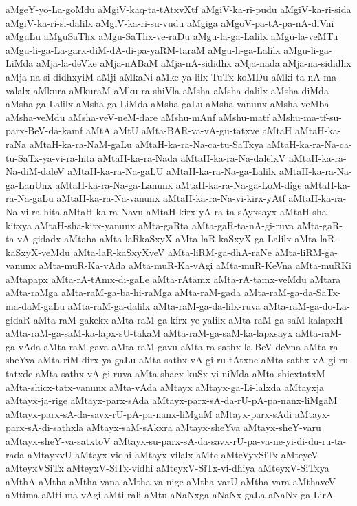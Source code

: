 {aMgeY-yo-La-goMdu
aMgiV-kaq-ta-tAtxvXtf
aMgiV-ka-ri-pudu
aMgiV-ka-ri-sida
aMgiV-ka-ri-si-dalilx
aMgiV-ka-ri-su-vudu
aMgiga
aMgoV-pa-tA-pa-nA-diVni
aMguLu
aMguSaThx
aMgu-SaThx-ve-raDu
aMgu-la-ga-Lalilx
aMgu-la-veMTu
aMgu-li-ga-La-garx-diM-dA-di-pa-yaRM-taraM
aMgu-li-ga-Lalilx
aMgu-li-ga-LiMda
aMja-la-deVke
aMja-nABaM
aMja-nA-sididhx
aMja-nada
aMja-na-sididhx
aMja-na-si-didhxyiM
aMji
aMkaNi
aMke-ya-lilx-TuTx-koMDu
aMki-ta-nA-ma-valalx
aMkura
aMkuraM
aMku-ra-shiVla
aMsha
aMsha-dalilx
aMsha-diMda
aMsha-ga-Lalilx
aMsha-ga-LiMda
aMsha-gaLu
aMsha-vanunx
aMsha-veMba
aMsha-veMdu
aMsha-veV-neM-dare
aMshu-mAnf
aMshu-matf
aMshu-ma-tf-su-parx-BeV-da-kamf
aMtA
aMtU
aMta-BAR-va-vA-gu-tatxve
aMtaH
aMtaH-ka-raNa
aMtaH-ka-ra-NaM-gaLu
aMtaH-ka-ra-Na-ca-tu-SaTxya
aMtaH-ka-ra-Na-ca-tu-SaTx-ya-vi-ra-hita
aMtaH-ka-ra-Nada
aMtaH-ka-ra-Na-dalelxV
aMtaH-ka-ra-Na-diM-daleV
aMtaH-ka-ra-Na-gaLU
aMtaH-ka-ra-Na-ga-Lalilx
aMtaH-ka-ra-Na-ga-LanUnx
aMtaH-ka-ra-Na-ga-Lanunx
aMtaH-ka-ra-Na-ga-LoM-dige
aMtaH-ka-ra-Na-gaLu
aMtaH-ka-ra-Na-vanunx
aMtaH-ka-ra-Na-vi-kirx-yAtf
aMtaH-ka-ra-Na-vi-ra-hita
aMtaH-ka-ra-Navu
aMtaH-kirx-yA-ra-ta-sAyxsayx
aMtaH-sha-kitxya
aMtaH-sha-kitx-yanunx
aMta-gaRta
aMta-gaR-ta-nA-gi-ruva
aMta-gaR-ta-vA-gidadx
aMtaha
aMta-laRkaSxyX
aMta-laR-kaSxyX-ga-Lalilx
aMta-laR-kaSxyX-veMdu
aMta-laR-kaSxyXveV
aMta-liRM-ga-dhA-raNe
aMta-liRM-ga-vanunx
aMta-muR-Ka-vAda
aMta-muR-Ka-vAgi
aMta-muR-KeVna
aMta-muRKi
aMtapapx
aMta-rA-tAmx-di-gaLe
aMta-rAtamx
aMta-rA-tamx-veMdu
aMtara
aMta-raMga
aMta-raM-ga-ba-hi-raMga
aMta-raM-gada
aMta-raM-ga-da-SaTx-ma-daM-gaLu
aMta-raM-ga-dalilx
aMta-raM-ga-da-lilx-ruva
aMta-raM-ga-do-La-gidaR
aMta-raM-gakekx
aMta-raM-ga-kirx-ye-yalilx
aMta-raM-ga-saM-kalapxH
aMta-raM-ga-saM-ka-lapx-sU-takaM
aMta-raM-ga-saM-ka-lapxsayx
aMta-raM-ga-vAda
aMta-raM-gava
aMta-raM-gavu
aMta-ra-sathx-la-BeV-deVna
aMta-ra-sheYva
aMta-riM-dirx-ya-gaLu
aMta-sathx-vA-gi-ru-tAtxne
aMta-sathx-vA-gi-ru-tatxde
aMta-sathx-vA-gi-ruva
aMta-shacx-kuSx-vi-niMda
aMta-shicxtatxM
aMta-shicx-tatx-vanunx
aMta-vAda
aMtayx
aMtayx-ga-Li-lalxda
aMtayxja
aMtayx-ja-rige
aMtayx-parx-sAda
aMtayx-parx-sA-da-rU-pA-pa-nanx-liMgaM
aMtayx-parx-sA-da-savx-rU-pA-pa-nanx-liMgaM
aMtayx-parx-sAdi
aMtayx-parx-sA-di-sathxla
aMtayx-saM-sAkxra
aMtayx-sheYva
aMtayx-sheY-varu
aMtayx-sheY-va-satxtoV
aMtayx-su-parx-sA-da-savx-rU-pa-va-ne-yi-di-du-ru-ta-rada
aMtayxvU
aMtayx-vidhi
aMtayx-vilalx
aMte
aMteVyxSiTx
aMteyeV
aMteyxVSiTx
aMteyxV-SiTx-vidhi
aMteyxV-SiTx-vi-dhiya
aMteyxV-SiTxya
aMthA
aMtha
aMtha-vana
aMtha-va-nige
aMtha-varU
aMtha-vara
aMthaveV
aMtima
aMti-ma-vAgi
aMti-rali
aMtu
aNaNxga
aNaNx-gaLa
aNaNx-ga-LirA
}
